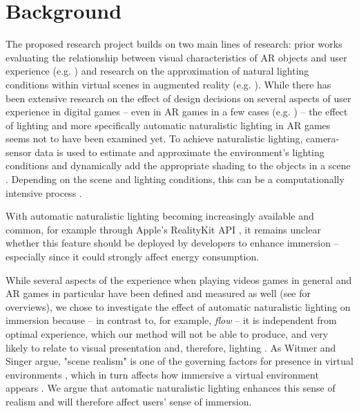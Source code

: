 \documentclass[12pt,twoside,english]{article}
\begin{document}
\section{Background}
\label{sect:background}
The proposed research project builds on two main lines of research: prior works evaluating the relationship between visual characteristics of \gls{AR} objects and user experience (e.g. \cite{gabbard_effects_2006}) and research on the approximation of natural lighting conditions within virtual scenes in augmented reality (e.g. \cite{aittala_inverse_2010}).
While there has been extensive research on the effect of design decisions on several aspects of user experience in digital games \cite{johnson_validation_2018} -- even in \gls{AR} games in a few cases (e.g. \cite{georgiou_development_2017}) -- the effect of lighting and more specifically automatic naturalistic lighting in \gls{AR} games seems not to have been examined yet.
To achieve naturalistic lighting, camera-sensor data is used to estimate and approximate the environment's lighting conditions and dynamically add the appropriate shading to the objects in a scene \cite{apple_arlightestimate_nodate,apple_pointlight_nodate}.
Depending on the scene and lighting conditions, this can be a computationally intensive process \cite{steed_constructing_2016}.

With automatic naturalistic lighting becoming increasingly available and common, for example through Apple's RealityKit API \cite{apple_realitykit_nodate}, it remains unclear whether this feature should be deployed by developers to enhance immersion -- especially since it could strongly affect energy consumption.

While several aspects of the experience when playing videos games in general and \gls{AR} games in particular have been defined and measured as well (see \cite{dey_systematic_2018, dunser_survey_2008} for overviews), we chose to investigate the effect of automatic naturalistic lighting on immersion because -- in contrast to, for example, \textit{flow} \cite{csikszentmihalyi_flow_1990} -- it is independent from optimal experience, which our method will not be able to produce, and very likely to relate to visual presentation and, therefore, lighting \cite{jennett_measuring_2008}.
As Witmer and Singer argue, "scene realism" is one of the governing factors for presence in virtual environments \cite{witmer_measuring_1998}, which in turn affects how immersive a virtual environment appears \cite{jennett_measuring_2008}.
We argue that automatic naturalistic lighting enhances this sense of realism and will therefore affect users' sense of immersion.
\end{document}
